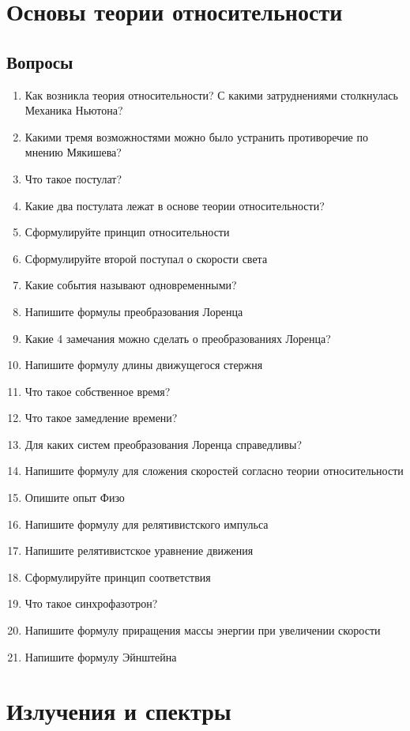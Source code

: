 \documentclass[12pt,a4paper]{report}
\begin{document}
\chapter{Основы теории относительности}
\section{Вопросы}
\begin{enumerate}
\item Как возникла теория относительности? С какими затруднениями столкнулась Механика Ньютона?
\item Какими тремя возможностями можно было устранить противоречие по мнению Мякишева?
\item Что такое постулат?
\item Какие два постулата лежат в основе теории относительности?
\item Сформулируйте принцип относительности
\item Сформулируйте второй поступал о скорости света
\item Какие события называют одновременными?
\item Напишите формулы преобразования Лоренца
\item Какие 4 замечания можно сделать о преобразованиях Лоренца?
\item Напишите формулу длины движущегося стержня
\item Что такое собственное время?
\item Что такое замедление времени?
\item Для каких систем преобразования Лоренца справедливы?
\item Напишите формулу для сложения скоростей согласно теории относительности
\item Опишите опыт Физо
\item Напишите формулу для релятивистского импульса
\item Напишите релятивистское уравнение движения
\item Сформулируйте принцип соответствия
\item Что такое синхрофазотрон?
\item Напишите формулу приращения массы энергии при увеличении скорости
\item Напишите формулу Эйнштейна
\end{enumerate}

\chapter{Излучения и спектры}
\end{document}
